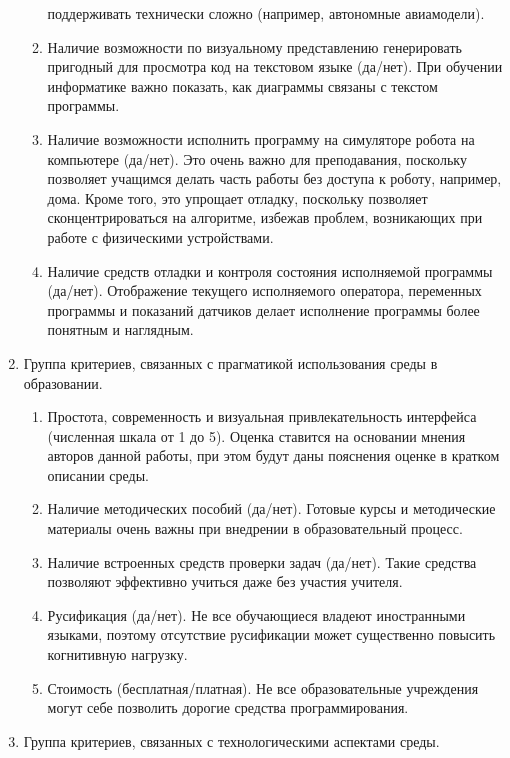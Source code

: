 \documentclass[a5paper]{article}
\begin{document}
\begin{enumerate}
\begin{enumerate}
                поддерживать технически сложно (например, автономные авиамодели).
        \item Наличие возможности по визуальному представлению генерировать пригодный для просмотра код на 
                текстовом языке (да/нет). При обучении информатике важно показать, как диаграммы 
                связаны с текстом программы.
        \item Наличие возможности исполнить программу на симуляторе робота на компьютере (да/нет). Это 
                очень важно для преподавания, поскольку позволяет учащимся делать часть работы без доступа к 
                роботу, например, дома. Кроме того, это упрощает отладку, поскольку позволяет сконцентрироваться 
                на алгоритме, избежав проблем, возникающих при работе с физическими устройствами.
        \item Наличие средств отладки и контроля состояния исполняемой программы (да/нет). Отображение 
                текущего исполняемого оператора, переменных программы и показаний датчиков делает исполнение 
                программы более понятным и наглядным.    
    \end{enumerate}
    \item Группа критериев, связанных с прагматикой использования среды в образовании.
    \begin{enumerate}
        \item Простота, современность и визуальная привлекательность интерфейса (численная шкала от 1 до 5). 
                Оценка ставится на основании мнения авторов данной работы, при этом будут даны пояснения 
                оценке в кратком описании среды.
        \item Наличие методических пособий (да/нет). Готовые курсы и методические материалы очень 
                важны при внедрении в образовательный процесс.
        \item Наличие встроенных средств проверки задач (да/нет). Такие средства позволяют эффективно 
                учиться даже без участия учителя.
        \item Русификация (да/нет). Не все обучающиеся владеют иностранными языками, поэтому отсутствие 
                русификации может существенно повысить когнитивную нагрузку.
        \item Стоимость (бесплатная/платная). Не все образовательные учреждения могут себе позволить дорогие 
                средства программирования.
    \end{enumerate}
    \item Группа критериев, связанных с технологическими аспектами среды.

\end{enumerate}
\end{document}
